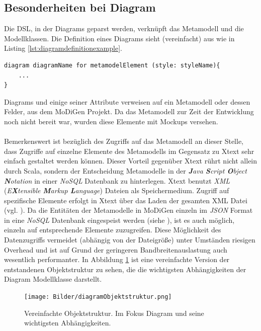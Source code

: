 \subsection{Besonderheiten bei Diagram}
Die DSL, in der Diagrams geparst werden, verknüpft das Metamodell und die Modellklassen. Die Definition eines Diagrams sieht (vereinfacht) aus wie in Listing \ref{lst:diagramdefinitionexample}.
\begin{lstlisting}[style=spray, caption = {Beispielhafte Diagram Definition (vereinfacht)}, label = {lst:diagramdefinitionexample}]
diagram diagramName for metamodelElement (style: styleName){
	...
}
\end{lstlisting}Diagrams und einige seiner Attribute verweisen auf ein Metamodell oder dessen Felder, aus dem MoDiGen Projekt.
Da das Metamodell zur Zeit der Entwicklung noch nicht bereit war, wurden diese Elemente mit Mockups versehen.\\\\Bemerkenswert ist bezüglich des Zugriffs auf das Metamodell an dieser Stelle, dass Zugriffe auf einzelne Elemente des Metamodells im Gegensatz zu Xtext sehr einfach gestaltet werden können. Dieser Vorteil gegenüber Xtext rührt nicht allein durch Scala, sondern der Entscheidung Metamodelle in der \textit{\textbf{J}ava \textbf{S}cript \textbf{O}bject \textbf{N}otation} in einer \textit{NoSQL} Datenbank zu hinterlegen. Xtext benutzt \textit{XML} (\textit{E\textbf{X}tensible \textbf{M}arkup \textbf{L}anguage}) Dateien als Speichermedium. Zugriff auf spezifische Elemente erfolgt in Xtext über das Laden der gesamten XML Datei (vgl. ). Da die Entitäten der Metamodelle in MoDiGen einzeln im \textit{JSON} Format in eine \textit{NoSQL} Datenbank eingespeist werden (siehe ), ist es auch möglich, einzeln auf entsprechende Elemente zuzugreifen. Diese Möglichkeit des Datenzugriffs vermeidet (abhängig von der Dateigröße) unter Umständen riesigen Overhead und ist auf Grund der geringeren Bandbreitenauslastung auch wesentlich performanter. In Abbildung \ref{objectstructureDiagram} ist eine vereinfachte Version der entstandenen Objektstruktur zu sehen, die die wichtigsten Abhängigkeiten der Diagram Modellklasse darstellt.
\begin{figure}[H]
\begin{center}
\texttt{[image: Bilder/diagramObjektstruktur.png]}
\caption{Vereinfachte Objektstruktur. Im Fokus Diagram und seine wichtigsten Abhängigkeiten.}
\label{objectstructureDiagram}
\end{center}
\end{figure}
